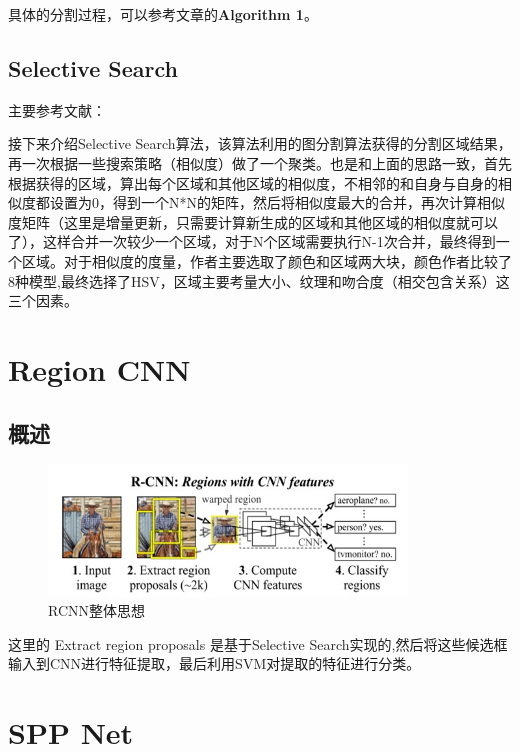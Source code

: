 具体的分割过程，可以参考文章\cite{Felzenszwalb2004}的\textbf{Algorithm 1}。

\subsection{Selective Search}
主要参考文献：\cite{Uijlings2013}

接下来介绍Selective Search算法，该算法利用\cite{Felzenszwalb2004}的图分割算法获得的分割区域结果，再一次根据一些搜索策略（相似度）做了一个聚类。也是和上面的思路一致，首先根据获得的区域，算出每个区域和其他区域的相似度，不相邻的和自身与自身的相似度都设置为0，得到一个N*N的矩阵，然后将相似度最大的合并，再次计算相似度矩阵（这里是增量更新，只需要计算新生成的区域和其他区域的相似度就可以了），这样合并一次较少一个区域，对于N个区域需要执行N-1次合并，最终得到一个区域。对于相似度的度量，作者主要选取了颜色和区域两大块，颜色作者比较了8种模型,最终选择了HSV，区域主要考量大小、纹理和吻合度（相交包含关系）这三个因素。





\section{Region CNN}

\subsection{概述}

\begin{figure}[!htbp]
\centering
\includegraphics[width=0.85\textwidth]{FeatureExtraction/RCNN0.jpg}
\caption{RCNN整体思想}
\label{RCNN0}
\end{figure}

这里的 Extract region proposals 是基于Selective Search实现的,然后将这些候选框输入到CNN进行特征提取，最后利用SVM对提取的特征进行分类。







\section{SPP Net}



